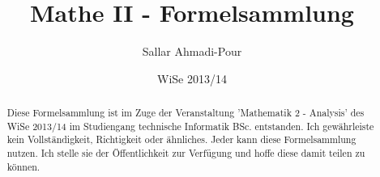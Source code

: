 \documentclass[11pt,oneside,a4paper, german]{article}
\title{Mathe II - Formelsammlung}
\author{Sallar Ahmadi-Pour}
\date{WiSe 2013/14}
\begin{document}
\maketitle
\begin{abstract}
Diese Formelsammlung ist im Zuge der Veranstaltung 'Mathematik 2 - Analysis' des WiSe 2013/14 im Studiengang technische Informatik BSc. entstanden. Ich gewährleiste kein Vollständigkeit, Richtigkeit oder ähnliches. Jeder kann diese Formelsammlung nutzen. Ich stelle sie der Öffentlichkeit zur Verfügung und hoffe diese damit teilen zu können.
\end{abstract}
\tableofcontents








\end{document}
